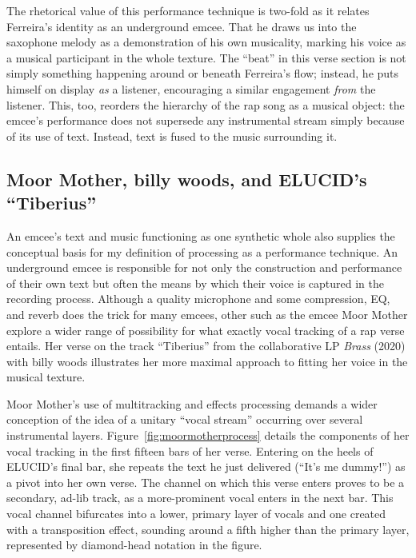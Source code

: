 The rhetorical value of this performance technique is two-fold as it relates Ferreira's identity as an
underground emcee. That he draws us into the saxophone melody as a demonstration of his own musicality,
marking his voice as a musical participant in the whole texture. The ``beat'' in this verse section is not
simply something happening around or beneath Ferreira's flow; instead, he puts himself on display \emph{as} 
a listener, encouraging a similar engagement \emph{from} the listener. This, too, reorders the hierarchy of
the rap song as a musical object: the emcee's performance does not supersede any instrumental stream simply
because of its use of text. Instead, text is fused to the music surrounding it.

\subsection*{\centering Moor Mother,  billy woods, and ELUCID's ``Tiberius''}

An emcee's text and music functioning as one synthetic whole also supplies the conceptual basis for my
definition of processing as a performance technique. An underground emcee is responsible for not only
the construction and performance of their own text but often the means by which their voice is captured
in the recording process. Although a quality microphone and some compression, EQ, and reverb does the 
trick for many emcees, other such as the emcee Moor Mother explore a wider range of possibility for what
exactly vocal tracking of a rap verse entails. Her verse on the track ``Tiberius'' from the collaborative
LP \textit{Brass} (2020) with billy woods illustrates her more maximal approach to fitting her voice in
the musical texture.

Moor Mother's use of multitracking and effects processing demands a wider conception of the idea of a
unitary ``vocal stream'' occurring over several instrumental layers. Figure~\ref{fig:moormotherprocess}
details the components of her vocal tracking in the first fifteen bars of her verse. Entering on the heels
of ELUCID's final bar, she repeats the text he just delivered (``It's me dummy!'') as a pivot into her
own verse. The channel on which this verse enters proves to be a secondary, ad-lib track, as a more-prominent
vocal enters in the next bar. This vocal channel bifurcates into a lower, primary layer of vocals and one
created with a transposition effect, sounding around a fifth higher than the primary layer, represented by
diamond-head notation in the figure.

